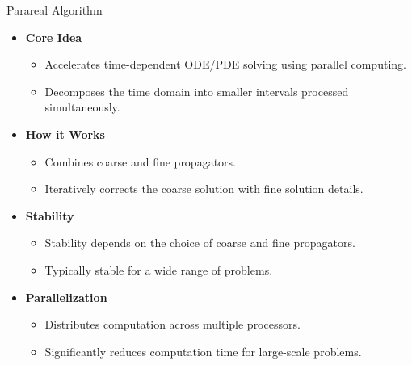 \documentclass[aspectratio=169,xcolor=dvipsnames, t]{beamer}
\begin{document}
\begin{frame}{Parareal Algorithm}
    \begin{itemize}
    \item \textbf{Core Idea}
    \begin{itemize}
        \item Accelerates time-dependent ODE/PDE solving using parallel computing.
        \item Decomposes the time domain into smaller intervals processed simultaneously.
    \end{itemize}
    \item \textbf{How it Works}
    \begin{itemize}
        \item Combines coarse and fine propagators.
        \item Iteratively corrects the coarse solution with fine solution details.
    \end{itemize}
    \item \textbf{Stability}
    \begin{itemize}
        \item Stability depends on the choice of coarse and fine propagators.
        \item Typically stable for a wide range of problems.
    \end{itemize}
    \item \textbf{Parallelization}
    \begin{itemize}
        \item Distributes computation across multiple processors.
        \item Significantly reduces computation time for large-scale problems.
    \end{itemize}
\end{itemize}
\end{frame}

\end{document}
